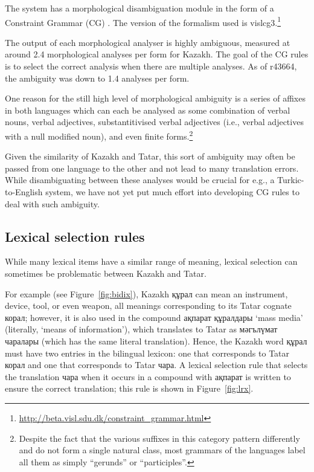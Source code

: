 \documentclass[a4paper,11pt]{article}
\newcommand{\eng}[1]{`#1'}
\begin{document}
The system has a morphological disambiguation module in the form of a 
Constraint Grammar (CG) \citep{karlsson95}. The version of the formalism used is vislcg3.\footnote{\url{http://beta.visl.sdu.dk/constraint_grammar.html}}


The output of each morphological analyser is highly ambiguous, measured at around 2.4 morphological analyses per form for Kazakh.  The goal of the CG rules is to select the correct analysis when there are multiple analyses.  As of r43664, the ambiguity was down to 1.4 analyses per form.

One reason for the still high level of morphological ambiguity is a series of affixes in both languages which can each be analysed as some combination of verbal nouns, verbal adjectives, substantitivised verbal adjectives (i.e., verbal adjectives with a null modified noun), and even finite forms.\footnote{Despite the fact that the various suffixes in this category pattern differently and do not form a single natural class, most grammars of the languages label all them as simply ``gerunds'' or ``participles''.}

Given the similarity of Kazakh and Tatar, this sort of ambiguity may often be passed from one language to the other and not lead to many translation errors.  While disambiguating between these analyses would be crucial for e.g., a Turkic-to-English system, we have not yet put much effort into developing CG rules to deal with such ambiguity.

  

\subsection{Lexical selection rules}

While many lexical items have a similar range of meaning, lexical selection can sometimes be problematic between Kazakh and Tatar.

For example (see Figure~\ref{fig:bidix}), Kazakh құрал can mean an instrument, device, tool, or even weapon, all 
meanings corresponding to its Tatar cognate корал; however, it is also used in the 
compound ақпарат құралдары \eng{mass media} (literally, \eng{means of information}), which translates 
to Tatar as мәгълүмат чаралары (which has the same literal translation).  Hence, the Kazakh word құрал must have 
two entries in the bilingual lexicon: one that corresponds to Tatar корал and one that corresponds 
to Tatar чара.  A lexical selection rule that selects the translation чара when it occurs in a compound with ақпарат is written to ensure the correct translation; this rule is shown in Figure~\ref{fig:lrx}.
\end{document}

